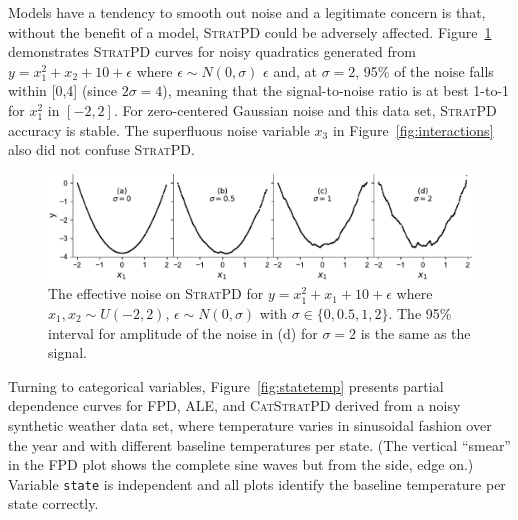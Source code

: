 \documentclass[]{article} %
\newcommand{\figref}[1]{Figure~\ref{#1}}
\newcommand{\spd}{\fontfamily{cmr}\textsc{\small StratPD}}
\newcommand{\cspd}{\fontfamily{cmr}\textsc{\small CatStratPD}}
\begin{document}
Models have a tendency to smooth out noise and a legitimate concern is that, without the benefit of a model, \spd{} could be adversely affected. \figref{fig:noise} demonstrates \spd{} curves for noisy quadratics generated from $y = x_1^2 + x_2 + 10 + \epsilon$ where $\epsilon \sim N(0,\sigma)$ $\epsilon$ and, at $\sigma=2$, 95\% of the noise falls within [0,4] (since $2\sigma = 4$), meaning that the signal-to-noise ratio is at best 1-to-1 for $x_1^2$ in $[-2,2]$. For zero-centered Gaussian noise and this data set, \spd{} accuracy is stable.  The superfluous noise variable $x_3$ in \figref{fig:interactions} also did not confuse \spd.

\begin{figure}[!htbp]
\begin{center}
\includegraphics[scale=0.45]{images/noise.pdf}\vspace{-2mm}\caption{\small The effective noise on \spd{} for $y = x_1^2 + x_1 + 10 + \epsilon$ where $x_1,x_2 \sim U(-2,2)$, $\epsilon \sim N(0,\sigma)$ with $\sigma \in \{0,0.5,1,2\}$. The 95\% interval for amplitude of the noise in (d) for $\sigma=2$ is the same as the signal.}
\label{fig:noise}
\end{center}
\end{figure}

Turning to categorical variables, \figref{fig:statetemp} presents partial dependence curves for FPD, ALE, and \cspd{} derived from a noisy synthetic weather data set, where temperature varies in sinusoidal fashion over the year and with different baseline temperatures per state. (The vertical ``smear'' in the FPD plot shows the complete sine waves but from the side, edge on.)  Variable {\tt\small state} is independent and all plots identify the baseline temperature per state correctly.
\end{document}
